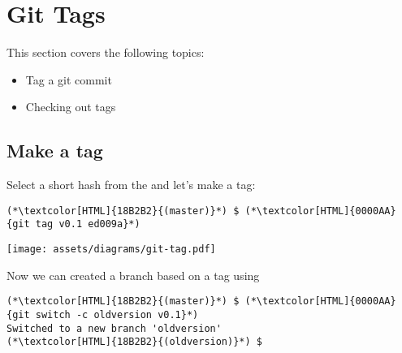 \section{Git Tags}
\begin{frame}[fragile]
  \slidetitle

  This section covers the following topics:
  \begin{itemize}
    \item Tag a git commit
    \item Checking out tags
  \end{itemize}
\end{frame}

\subsection{Make a tag}
\begin{frame}[fragile]
  \subslidetitle

  Select a short hash from the  and let's make a tag:
  \begin{lstlisting}
(*\textcolor[HTML]{18B2B2}{(master)}*) $ (*\textcolor[HTML]{0000AA}{git tag v0.1 ed009a}*)
\end{lstlisting}
  \centerline{\texttt{[image: assets/diagrams/git-tag.pdf]}}

  \vspace{1em}
  Now we can created a branch based on a tag using 
  \begin{lstlisting}
(*\textcolor[HTML]{18B2B2}{(master)}*) $ (*\textcolor[HTML]{0000AA}{git switch -c oldversion v0.1}*)
Switched to a new branch 'oldversion'
(*\textcolor[HTML]{18B2B2}{(oldversion)}*) $
\end{lstlisting}

\end{frame}

